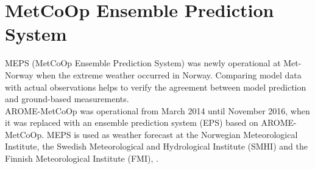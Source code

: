 \section{MetCoOp Ensemble Prediction System}
MEPS (MetCoOp Ensemble Prediction System) was newly operational at Met-Norway when the extreme weather occurred in Norway. Comparing model data with actual observations helps to verify the agreement between model prediction and ground-based measurements. 
\\
AROME-MetCoOp was operational from March 2014 until November 2016, when it was replaced with an ensemble prediction system (EPS) based on AROME-MetCoOp.
MEPS is used as weather forecast at the Norwegian Meteorological Institute, the Swedish Meteorological and Hydrological Institute (SMHI) and the Finnish Meteorological Institute (FMI), \citep{muller_arome-metcoop:_2017, koltzow_metcoop_2017}.
